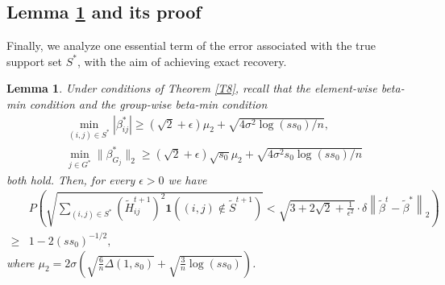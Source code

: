 \documentclass[12pt]{article}
\newtheorem{lemma}{Lemma}
\begin{document}
\begin{appendix}
\subsection{Lemma \ref{exactsupporterror} and its proof}
Finally, we analyze one essential term of the error associated with the true support set $S^*$, with the aim of achieving exact recovery.
\begin{lemma}\label{exactsupporterror}
    Under conditions of Theorem \ref{T8}, recall that the element-wise beta-min condition and the group-wise beta-min condition 
    \begin{equation}
    \begin{aligned}
        &\min_{(i,j)\in S^*}|\beta^*_{ij}| \ge (\sqrt2+ \epsilon)\mu_2 + \sqrt{ {4\sigma^2\log(ss_0)}/{n}},\\
        &\min_{j \in G^*}\|\beta^*_{G_j}\|_2 \ge (\sqrt{2}+ \epsilon) \sqrt{s_0}\mu_2+  \sqrt{ {4\sigma^2 s_0 \log(ss_0)}/{n}}
    \end{aligned}
    \end{equation}
    both hold.
    Then, for every $\epsilon >0$ we have
\begin{align*} 
    &P\left( \sqrt{\sum_{(i,j) \in S^*} \left( \tilde H_{ij}^{t+1}\right)^2 \mathbf1\left( (i,j) \notin \tilde S^{t+1}\right)} 
    < \sqrt{3+2\sqrt2 + \frac1{\epsilon^2} } \cdot \delta \left\| \tilde\beta^t - \tilde \beta^* \right\|_2   \right)\\
    \ge& 1 - 2 (ss_0)^{-1/2},
\end{align*}
where $\mu_2 = 2\sigma \left( \sqrt{ \frac{6}{n} \Delta(1,s_0) } + \sqrt{ \frac{3}{n} \log(ss_0) } \right)$.
\end{lemma}



\end{appendix}
\end{document}
